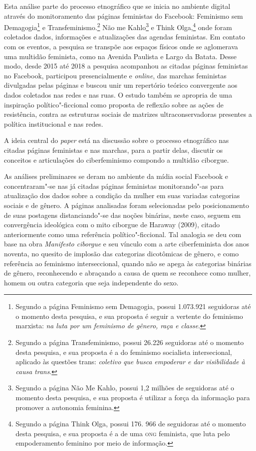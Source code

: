 \noindent{}Esta análise parte do processo etnográfico que se inicia no ambiente
digital através do monitoramento das páginas feministas do Facebook:
Feminismo sem Demagogia\footnote{Segundo a página Feminismo sem
  Demagogia, possui 1.073.921 seguidoras até o momento
  desta pesquisa, e sua proposta é seguir a vertente do feminismo marxista: \textit{na luta por um
  feminismo de gênero, raça e classe}.} e Transfeminismo.\footnote{Segundo a página
  Transfeminismo, possui 26.226 seguidoras até o momento desta pesquisa,
  e sua proposta é a do feminismo socialista intersecional, aplicado às
  questões trans: \textit{coletivo que busca empoderar e dar visibilidade à
  causa trans}.} Não me Kahlo\footnote{Segundo a página Não Me Kahlo, possui 1,2 milhões de seguidoras até o momento desta pesquisa, e sua proposta é utilizar a força da informação para
  promover a autonomia feminina.} e Think Olga,\footnote{Segundo a página Think Olga,
  possui 176. 966 de seguidoras até o momento desta pesquisa, e sua
  proposta é a de uma \textsc{ong} feminista, que luta pelo
  empoderamento feminino por meio de informação.} onde foram coletados dados, informações e atualizações
das agendas feministas. Em contato com os eventos, a pesquisa se
transpõe aos espaços físicos onde se aglomerava uma multidão feminista,
como na Avenida Paulista e Largo da Batata. Desse modo, desde 2015 até
2018 a pesquisa acompanhou as citadas páginas feministas no Facebook,
participou presencialmente e \textit{online}, das marchas feministas divulgadas
pelas páginas e buscou unir um repertório teórico convergente aos dados
coletados nas redes e nas ruas. O estudo também se apropria de uma
inspiração político"-ficcional como proposta de reflexão sobre as ações
de resistência, contra as estruturas sociais de matrizes
ultraconservadoras presentes a política institucional e nas redes.

A ideia central do \textit{paper} está na discussão sobre o processo etnográfico
nas citadas páginas feministas e nas marchas, para a partir delas,
discutir os conceitos e articulações do ciberfeminismo compondo a
multidão ciborgue.

As análises preliminares se deram no ambiente da mídia social Facebook e
concentraram"-se nas já citadas páginas feministas monitorando"-as para
atualização dos dados sobre a condição da mulher em suas variadas
categorias sociais e de gênero. A páginas analisadas foram selecionadas
pelo posicionamento de suas postagens distanciando"-se das noções
binárias, neste caso, seguem em convergência ideológica com o mito
ciborgue de Haraway (2009), citado anteriormente como uma referência
político"-ficcional. Tal analogia se deu com base na obra \textit{Manifesto
ciborgue} e seu vínculo com a arte ciberfeminista dos anos noventa, no
quesito de implosão das categorias dicotômicas de gênero, e como
referência ao feminismo interseccional, quando não se apega às
categorias binárias de gênero, reconhecendo e abraçando a causa de quem
se reconhece como mulher, homem ou outra categoria que seja independente
do sexo.

